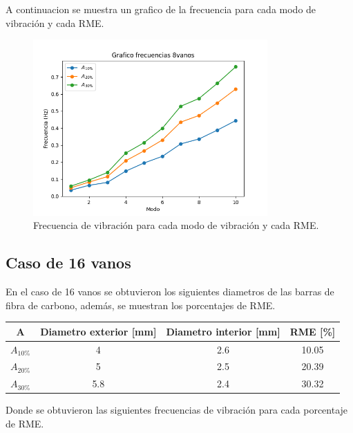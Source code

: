 A continuacion se muestra un grafico de la frecuencia para cada modo de vibración y cada RME. 

\begin{figure}[H]
    \centering
    \includegraphics[width=0.8\textwidth]{../grafico_frecuencias_8vanos.png}
    \caption{Frecuencia de vibración para cada modo de vibración y cada RME.}
\end{figure}

\subsection{Caso de 16 vanos}
En el caso de 16 vanos se obtuvieron los siguientes diametros de las barras de fibra de carbono, además, se muestran los porcentajes de RME.

\begin{table}[H]
    \centering
    \begin{tabular}{cccc}
    \toprule
     A & Diametro exterior [mm] & Diametro interior [mm] & RME [\%] \\
    \midrule
     $A_{10\%}$ &  4 &  2.6 &  10.05 \\
     $A_{20\%}$ &  5 &  2.5 &  20.39 \\
     $A_{30\%}$ &  5.8 &  2.4 &  30.32 \\
    \bottomrule
    \end{tabular}
\end{table}

Donde se obtuvieron las siguientes frecuencias de vibración para cada porcentaje de RME.

